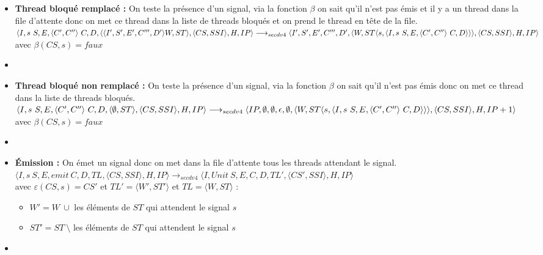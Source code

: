 \documentclass[10pt,a4paper]{report}
\begin{document}
\begin{enumerate}
\begin{itemize}
    
  \item[] \textbf{Thread bloqué remplacé :} On teste la présence d'un signal, via la fonction $\beta$ on sait qu'il n'est pas émis et il y a un thread dans la file d'attente
    donc on met ce thread dans la liste de threads bloqués et on prend le thread en tête de la file.
    \smallbreak
    $\langle I,s~S,E,\langle C',C''\rangle~C,D,\langle\langle I',S',E',C''',D'\rangle W,ST\rangle,\langle CS,SSI\rangle,H,IP\rangle 
    \\\longrightarrow_{secdv4} \langle I',S',E',C''',D',\langle W,ST\langle s,\langle I,s~S,E,\langle C',C''\rangle~C,D\rangle\rangle\rangle,\langle CS,SSI\rangle,H,IP\rangle$ \\
    avec $\beta(CS,s) = faux$
  \item[]	
    
  \item[] \textbf{Thread bloqué non remplacé :} On teste la présence d'un signal, via la fonction $\beta$ on sait qu'il n'est pas émis donc on met ce thread dans la liste de threads bloqués.
    \smallbreak 
    $\langle I,s~S,E,\langle C',C''\rangle~C,D,\langle \emptyset,ST\rangle,\langle CS,SSI\rangle,H,IP\rangle 
    \\\longrightarrow_{secdv4} \langle IP,\emptyset,\emptyset,\epsilon,\emptyset,\langle W,ST\langle s,\langle I,s~S,E,\langle C',C''\rangle~C,D\rangle\rangle\rangle,\langle CS,SSI\rangle,H,IP+1\rangle$ \\
    avec $\beta(CS,s) = faux$
  \item[]	
    \newpage
    
    
    
  \item[] \textbf{Émission :} On émet un signal donc on met dans la file d'attente tous les threads attendant le signal.
    \smallbreak
    $\langle I,s~S,E,emit~C,D,TL,\langle CS,SSI\rangle,H,IP\rangle 
    \longrightarrow_{secdv4} \langle I,Unit~S,E,C,D,TL',\langle CS',SSI\rangle,H,IP\rangle$\\
    avec $\varepsilon(CS,s) = CS'$ et $TL' = \langle W',ST'\rangle$ et $TL = \langle W,ST\rangle$ :
    \begin{itemize}
    \item[] $W' = W~\cup$ les éléments de $ST$ qui attendent le signal $s$ 
    \item[] $ST' = ST~\setminus$ les éléments de $ST$ qui attendent le signal $s$ 
    \end{itemize}
  \item[]
    

\end{itemize}
\end{enumerate}
\end{document}
